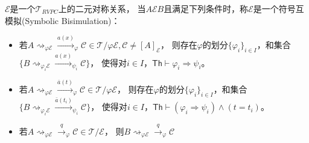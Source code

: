 \begin{definition}[符号互模拟]
   $\mathcal{E}$是一个$\mathcal{T}_{RVPC}$上的二元对称关系，
当$A\mathcal{E}B$且满足下列条件时，称$\mathcal{E}$是一个符号互模拟(Symbolic Bisimulation)：
\begin{itemize}
   \item {
      若$ A \rightsquigarrow_{\varphi \mathcal{E}}\stackrel{a(x)}{\rightarrow}_{\varphi} \mathcal{C}\in \mathcal{T}/\varphi\mathcal{E}, \mathcal{C}\neq [A]_{\mathcal{E}}$，
      则存在$\varphi$的划分$\{\varphi_i\}_{i\in I}$，和集合$\{B\rightsquigarrow_{\varphi_i \mathcal{E}}\stackrel{a(x)}{\rightarrow}_{\psi_i} \mathcal{C}\}$，
      使得对$i\in I$，$\mathsf{Th}\vdash \varphi_i \Rightarrow \psi_i$。
   }
   \item {
      若$A \rightsquigarrow_{\varphi \mathcal{E}}\stackrel{\bar{a}(t)}{\rightarrow}_{\varphi} \mathcal{C}\in \mathcal{T}/\varphi\mathcal{E}$，
      则存在$\varphi$的划分$\{\varphi_i\}_{i\in I}$，和集合$\{B\rightsquigarrow_{\varphi_i\mathcal{E}}\stackrel{\bar{a}(t_i)}{\rightarrow}_{\psi_i} \mathcal{C}\}$，
      使得对$i\in I$，$\mathsf{Th}\vdash (\varphi_i \Rightarrow \psi_i)\wedge (t=t_i)$。
   }
   \item {
      若$ A\rightsquigarrow_{\varphi\mathcal{E}} \stackrel{q}{\rightarrow}_{\varphi} \mathcal{C}\in \mathcal{T}/\mathcal{E}$，
      则$B\rightsquigarrow_{\varphi \mathcal{E}} \stackrel{q}{\rightarrow}_{\varphi} \mathcal{C}$
   }
\end{itemize}

\end{definition}


